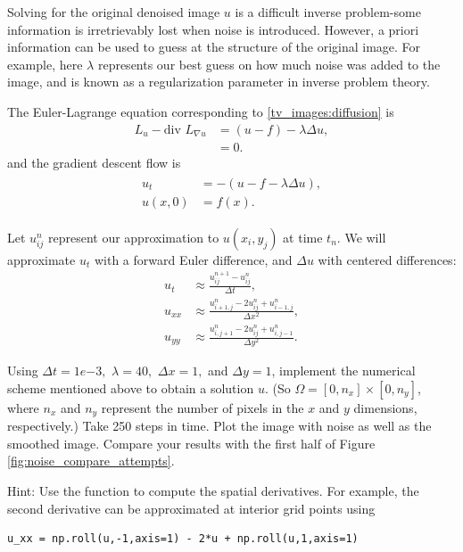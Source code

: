 Solving for the original denoised image $u$ is a difficult inverse problem-some information is irretrievably lost when noise is introduced. However, a priori information can be used to guess at the structure of the original image.  For example, here $\lambda$ represents our best guess on how much noise was added to the image, and is known as a regularization parameter in inverse problem theory.

The Euler-Lagrange equation corresponding to \eqref{tv_images:diffusion} is
\begin{align*}
L_u - \text{div } L_{\nabla u} &= (u-f) - \lambda \Delta u,\\
&= 0.
\end{align*}
and the gradient descent flow is
\begin{align}
    \begin{split}
u_t &= -(u-f -\lambda \Delta u),\\
u(x,0) &= f(x).
    \end{split} \label{tv_images:diffusion_flow}
\end{align}

Let $u_{ij}^n$ represent our approximation to $u(x_i,y_j)$ at time $t_n$. We will approximate $u_t$ with a forward Euler difference, and $\Delta u$ with centered differences:
\begin{align*}
    u_t &\approx \frac{u_{ij}^{n+1}-u_{ij}^n}{\Delta t},\\
    u_{xx} &\approx \frac{u_{i+1,j}^{n}-2u_{ij}^n + u_{i-1,j}^n}{\Delta x^2}, \\
    u_{yy} &\approx \frac{u_{i,j+1}^{n}-2u_{ij}^n + u_{i,j-1}^n}{\Delta y^2}.
\end{align*}


\begin{problem}
Using $\Delta t = 1e{-3},$ $\lambda = 40,$ $\Delta x = 1,$ and $\Delta y = 1$, implement the numerical scheme mentioned above to obtain a solution $u$. (So $\Omega = [0,n_x]\times [0,n_y]$, where $n_x$ and $n_y$ represent the number of pixels in the $x$ and $y$ dimensions, respectively.) Take 250 steps in time. Plot the image with noise as well as the smoothed image. Compare your results with the first half of Figure \ref{fig:noise_compare_attempts}.

Hint: Use the function  to compute the spatial derivatives. For example, the second derivative can be approximated at interior grid points using
\begin{lstlisting}
u_xx = np.roll(u,-1,axis=1) - 2*u + np.roll(u,1,axis=1)
\end{lstlisting}
\end{problem}




